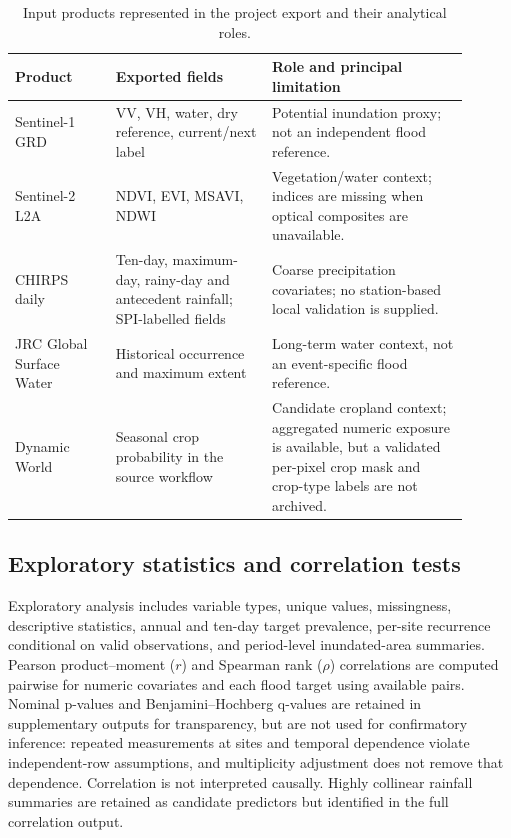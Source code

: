 \documentclass[pdflatex,sn-mathphys,Numbered]{sn-jnl}
\begin{document}
\begin{table}[t]
\centering
\caption{Input products represented in the project export and their analytical roles.}
\label{tab:datasets}
\begin{tabular}{p{0.20\linewidth}p{0.31\linewidth}p{0.39\linewidth}}
\toprule
Product & Exported fields & Role and principal limitation \\
\midrule
Sentinel-1 GRD & VV, VH, water, dry reference, current/next label & Potential inundation proxy; not an independent flood reference. \\
Sentinel-2 L2A & NDVI, EVI, MSAVI, NDWI & Vegetation/water context; indices are missing when optical composites are unavailable. \\
CHIRPS daily & Ten-day, maximum-day, rainy-day and antecedent rainfall; SPI-labelled fields & Coarse precipitation covariates; no station-based local validation is supplied. \\
JRC Global Surface Water & Historical occurrence and maximum extent & Long-term water context, not an event-specific flood reference. \\
Dynamic World & Seasonal crop probability in the source workflow & Candidate cropland context; aggregated numeric exposure is available, but a validated per-pixel crop mask and crop-type labels are not archived. \\
\bottomrule
\end{tabular}
\end{table}

\subsection{Exploratory statistics and correlation tests}
Exploratory analysis includes variable types, unique values, missingness, descriptive statistics, annual and ten-day target prevalence, per-site recurrence conditional on valid observations, and period-level inundated-area summaries. Pearson product--moment ($r$) and Spearman rank ($\rho$) correlations are computed pairwise for numeric covariates and each flood target using available pairs. Nominal p-values and Benjamini--Hochberg q-values are retained in supplementary outputs for transparency, but are not used for confirmatory inference: repeated measurements at sites and temporal dependence violate independent-row assumptions, and multiplicity adjustment does not remove that dependence. Correlation is not interpreted causally. Highly collinear rainfall summaries are retained as candidate predictors but identified in the full correlation output.
\end{document}
